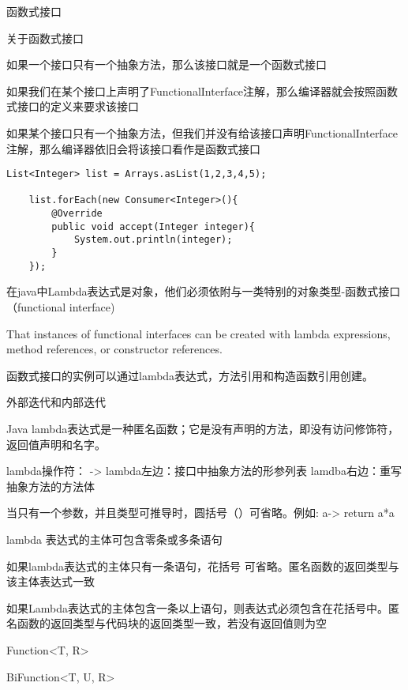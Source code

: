函数式接口

关于函数式接口

如果一个接口只有一个抽象方法，那么该接口就是一个函数式接口

如果我们在某个接口上声明了FunctionalInterface注解，那么编译器就会按照函数式接口的定义来要求该接口

如果某个接口只有一个抽象方法，但我们并没有给该接口声明FunctionalInterface注解，那么编译器依旧会将该接口看作是函数式接口

\begin{lstlisting}[style=cjava]
    List<Integer> list = Arrays.asList(1,2,3,4,5);

    list.forEach(new Consumer<Integer>(){
        @Override
        public void accept(Integer integer){
            System.out.println(integer);
        }
    });
\end{lstlisting}

在java中Lambda表达式是对象，他们必须依附与一类特别的对象类型-函数式接口（functional interface)

That instances of functional interfaces can be created with lambda expressions, method references, or constructor references.

函数式接口的实例可以通过lambda表达式，方法引用和构造函数引用创建。


外部迭代和内部迭代

Java lambda表达式是一种匿名函数；它是没有声明的方法，即没有访问修饰符，返回值声明和名字。

lambda操作符： ->
lambda左边：接口中抽象方法的形参列表
lamdba右边：重写抽象方法的方法体


当只有一个参数，并且类型可推导时，圆括号（）可省略。例如: a-> return a*a

lambda 表达式的主体可包含零条或多条语句

如果lambda表达式的主体只有一条语句，花括号{} 可省略。匿名函数的返回类型与该主体表达式一致

如果Lambda表达式的主体包含一条以上语句，则表达式必须包含在花括号{}中。匿名函数的返回类型与代码块的返回类型一致，若没有返回值则为空



Function<T, R>
 
BiFunction<T, U, R>


